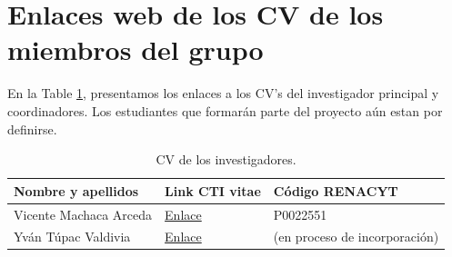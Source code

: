 \documentclass[a4paper,11pt]{article}
\begin{document}
\section{Enlaces web de los CV de los miembros del grupo }

En la Table \ref{tab:inve}, presentamos los enlaces a los CV's  del investigador principal y coordinadores. Los estudiantes que formarán parte del proyecto aún estan por definirse.

\begin{table}[H]
\centering
\caption{CV de los investigadores.}
\label{tab:inve}
\setlength{\tabcolsep}{0.5em} %
{\renewcommand{\arraystretch}{1.5}%
{\small
\begin{tabular}{|p{5.8cm}p{5cm}p{6cm}|} \hline
\textbf{Nombre y apellidos} & \textbf{Link CTI vitae}                                                                      & \textbf{Código RENACYT} \\ \hline
Vicente Machaca Arceda      & \href{https://dina.concytec.gob.pe/appDirectorioCTI/VerDatosInvestigador.do?id\_investigador=22551}{Enlace} & P0022551                \\
Yván Túpac Valdivia    & \href{https://dina.concytec.gob.pe/appDirectorioCTI/VerDatosInvestigador.do?id_investigador=4409}{Enlace} & (en proceso de incorporación)     \\ \hline                 
\end{tabular}
}
}
\end{table}


	
\end{document}
